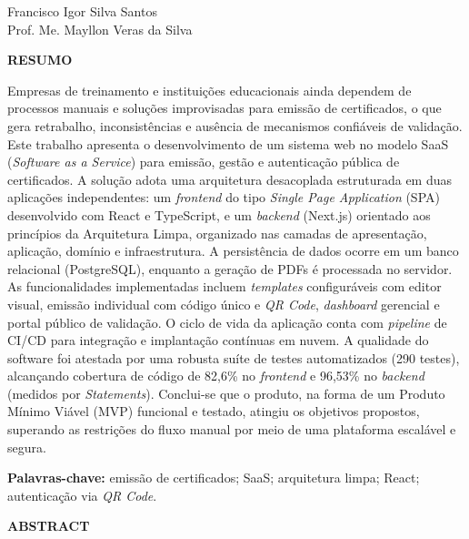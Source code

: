 \documentclass[12pt,openright,oneside,a4paper]{article}
\newcommand{\Autor}{Francisco Igor Silva Santos}
\newcommand{\Orientador}{Prof. Me. Mayllon Veras da Silva}
\begin{document}
\vspace{1cm}

\begin{flushright}
\Autor \\
\Orientador
\end{flushright}

\vspace{1cm}

\thispagestyle{pretextual}
\begin{center}
\textbf{RESUMO}
\end{center}

Empresas de treinamento e instituições educacionais ainda dependem de processos manuais e soluções improvisadas para emissão de certificados, o que gera retrabalho, inconsistências e ausência de mecanismos confiáveis de validação. Este trabalho apresenta o desenvolvimento de um sistema web no modelo SaaS (\textit{Software as a Service}) para emissão, gestão e autenticação pública de certificados. A solução adota uma arquitetura desacoplada estruturada em duas aplicações independentes: um \textit{frontend} do tipo \textit{Single Page Application} (SPA) desenvolvido com React e TypeScript, e um \textit{backend} (Next.js) orientado aos princípios da Arquitetura Limpa, organizado nas camadas de apresentação, aplicação, domínio e infraestrutura. A persistência de dados ocorre em um banco relacional (PostgreSQL), enquanto a geração de PDFs é processada no servidor. As funcionalidades implementadas incluem \textit{templates} configuráveis com editor visual, emissão individual com código único e \textit{QR Code}, \textit{dashboard} gerencial e portal público de validação. O ciclo de vida da aplicação conta com \textit{pipeline} de CI/CD para integração e implantação contínuas em nuvem. A qualidade do software foi atestada por uma robusta suíte de testes automatizados (290 testes), alcançando cobertura de código de 82,6\% no \textit{frontend} e 96,53\% no \textit{backend} (medidos por \textit{Statements}). Conclui-se que o produto, na forma de um Produto Mínimo Viável (MVP) funcional e testado, atingiu os objetivos propostos, superando as restrições do fluxo manual por meio de uma plataforma escalável e segura.

\noindent\textbf{Palavras-chave:} emissão de certificados; SaaS; arquitetura limpa; React; autenticação via \textit{QR Code}.

\newpage
\begin{center}
\textbf{ABSTRACT}
\end{center}
\end{document}
